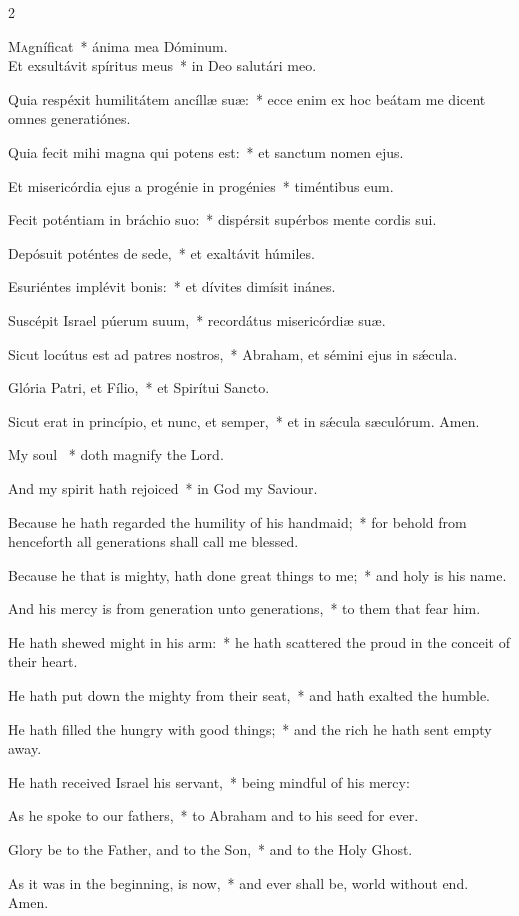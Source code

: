 \documentclass[12pt]{book}
\begin{document}
\begin{paracol}{2}

\lettrine{M}agníficat~* ánima mea Dóminum.\\ Et exsultávit spíritus meus~* in Deo salutári meo.

 Quia respéxit humilitátem ancíllæ suæ:~* ecce enim ex hoc beátam me dicent o\-mnes generatiónes.

 Quia fecit mihi magna qui potens est:~* et san\-ctum nomen ejus.

 Et misericórdia ejus a progénie in progénies~* timéntibus eum.

 Fecit poténtiam in bráchio suo:~* dispérsit supérbos mente cordis sui.

 Depósuit poténtes de sede,~* et exaltávit húmiles.

 Esuriéntes implévit bonis:~* et dívites dimísit inánes.

 Suscépit Israel púerum suum,~* recordátus misericórdiæ suæ.

 Sicut locútus est ad patres no\-stros,~* Abraham, et sémini ejus in sǽcula.

 Glória Patri, et Fílio,~* et Spirítui San\-cto.

 Sicut erat in princípio, et nunc, et semper,~* et in sǽcula sæculórum. Amen.
 
 \switchcolumn
 \begin{enpars}
My soul \cc~* doth magnify the Lord.

And my spirit hath rejoiced~* in God my Saviour.

Because he hath regarded the humility of his handmaid;~* for behold from henceforth all generations shall call me blessed.

Because he that is mighty, hath done great things to me;~* and holy is his name.

And his mercy is from generation unto generations,~* to them that fear him.

He hath shewed might in his arm:~* he hath scattered the proud in the conceit of their heart.

He hath put down the mighty from their seat,~* and hath exalted the humble.

He hath filled the hungry with good things;~* and the rich he hath sent empty away.

He hath received Israel his servant,~* being mindful of his mercy:

As he spoke to our fathers,~* to Abraham and to his seed for ever.

Glory be to the Father, and to the Son,~* and to the Holy Ghost.

As it was in the beginning, is now,~* and ever shall be, world without end. Amen.
\end{enpars}
 \end{paracol}
\end{document}
